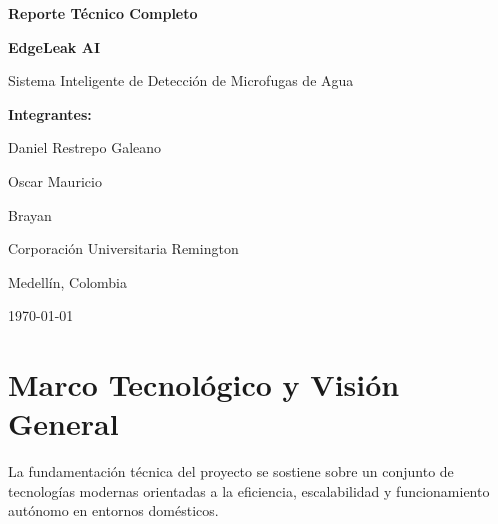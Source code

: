 \documentclass[11pt,a4paper]{article}
\begin{document}
\begin{titlepage}
    \centering
    \vspace*{4cm}
    
    {\Huge \textbf{Reporte Técnico Completo}\par}
    \vspace{1cm}
    {\Huge \textbf{EdgeLeak AI}\par}
    \vspace{0.5cm}
    {\Large Sistema Inteligente de Detección de Microfugas de Agua\par}
    
    \vspace{4cm}
    
    {\Large \textbf{Integrantes:}\par}
    \vspace{0.5cm}
    {\large Daniel Restrepo Galeano \par}
    {\large Oscar Mauricio \par}
    {\large Brayan \par}
    
    \vfill
    
    {\large Corporación Universitaria Remington \par}
    {\large Medellín, Colombia \par}
    {\large \today \par}
\end{titlepage}

\newpage
\tableofcontents
\newpage
\listoftables
\newpage
\listoffigures
\newpage

\section{Marco Tecnológico y Visión General}

La fundamentación técnica del proyecto se sostiene sobre un conjunto de tecnologías modernas orientadas a la eficiencia, escalabilidad y funcionamiento autónomo en entornos domésticos.
\end{document}
